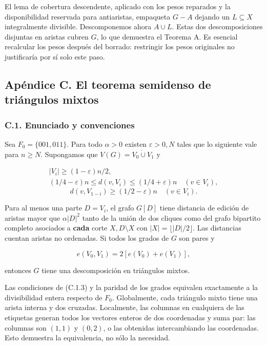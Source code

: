 \documentclass[spanish,11pt,a4paper]{article}
\begin{document}
El lema de cobertura descendente, aplicado con los pesos reparados y la disponibilidad reservada para antiaristas, empaqueta \(G-A\) dejando un \(L\subseteq X\) integralmente divisible. Descomponemos ahora \(A\cup L\). Estas dos descomposiciones disjuntas en aristas cubren \(G\), lo que demuestra el Teorema A. Es esencial recalcular los pesos después del borrado: restringir los pesos originales no justificaría por sí solo este paso.

\bigskip

\subsection{Apéndice C. El teorema semidenso de triángulos mixtos}\label{apuxe9ndice-c.-el-teorema-semidenso-de-triuxe1ngulos-mixtos}

\subsubsection{C.1. Enunciado y convenciones}\label{c.1.-enunciado-y-convenciones}

Sea \(F_0=\{001,011\}\). Para todo \(\alpha>0\) existen \(\varepsilon>0,N\) tales que lo siguiente vale para \(n\ge N\). Supongamos que \(V(G)=V_0\dot\cup V_1\) y

\[\begin{gathered}
|V_i|\ge(1-\varepsilon)n/2,\\
(1/4-\varepsilon)n\le d(v,V_i)\le(1/4+\varepsilon)n
\quad(v\in V_i),
\end{gathered}
\tag{C.1.1}\] \[d(v,V_{1-i})\ge(1/2-\varepsilon)n\quad(v\in V_i).
\tag{C.1.2}\]

Para al menos una parte \(D=V_i\), el grafo \(G[D]\) tiene distancia de edición de aristas mayor que \(\alpha|D|^2\) tanto de la unión de dos cliques como del grafo bipartito completo asociados a \textbf{cada} corte \(X,D\setminus X\) con \(|X|=\lfloor|D|/2\rfloor\). Las distancias cuentan aristas no ordenadas. Si todos los grados de \(G\) son pares y

\[e(V_0,V_1)=2[e(V_0)+e(V_1)],
\tag{C.1.3}\]

entonces \(G\) tiene una descomposición en triángulos mixtos.

Las condiciones de (C.1.3) y la paridad de los grados equivalen exactamente a la divisibilidad entera respecto de \(F_0\). Globalmente, cada triángulo mixto tiene una arista interna y dos cruzadas. Localmente, las columnas en cualquiera de las etiquetas generan todos los vectores enteros de dos coordenadas y suma par: las columnas son \((1,1)\) y \((0,2)\), o las obtenidas intercambiando las coordenadas. Esto demuestra la equivalencia, no sólo la necesidad.
\end{document}
